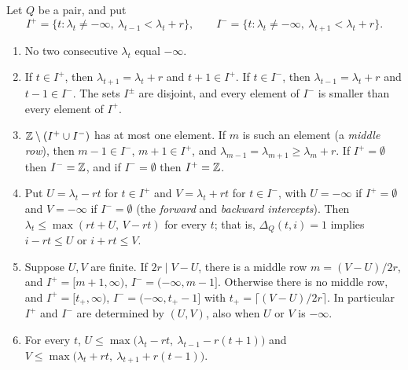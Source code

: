 \begin{proposition}\label{gen:prop:profile}
Let $Q$ be a pair, and put
\[
I^+=\{t:\lambda_t\ne-\infty,\ \lambda_{t-1}<\lambda_t+r\},\qquad I^-=\{t:\lambda_t\ne-\infty,\ \lambda_{t+1}<\lambda_t+r\}.
\]
\begin{enumerate}
\item No two consecutive $\lambda_t$ equal $-\infty$.
\item If $t\in I^+$, then $\lambda_{t+1}=\lambda_t+r$ and $t+1\in I^+$. If $t\in I^-$, then $\lambda_{t-1}=\lambda_t+r$ and $t-1\in I^-$. The sets $I^\pm$ are disjoint, and every element of $I^-$ is smaller than every element of $I^+$.
\item $\mathbb{Z}\setminus(I^+\cup I^-)$ has at most one element. If $m$ is such an element (a \emph{middle row}), then $m-1\in I^-$, $m+1\in I^+$, and $\lambda_{m-1}=\lambda_{m+1}\ge\lambda_m+r$. If $I^+=\emptyset$ then $I^-=\mathbb{Z}$, and if $I^-=\emptyset$ then $I^+=\mathbb{Z}$.
\item Put $U=\lambda_t-rt$ for $t\in I^+$ and $V=\lambda_t+rt$ for $t\in I^-$, with $U=-\infty$ if $I^+=\emptyset$ and $V=-\infty$ if $I^-=\emptyset$ (the \emph{forward} and \emph{backward intercepts}). Then $\lambda_t\le\max(rt+U,\,V-rt)$ for every $t$; that is, $\Delta_Q(t,i)=1$ implies $i-rt\le U$ or $i+rt\le V$.
\item Suppose $U,V$ are finite. If $2r\mid V-U$, there is a middle row $m=(V-U)/2r$, and $I^+=[m+1,\infty)$, $I^-=(-\infty,m-1]$. Otherwise there is no middle row, and $I^+=[t_+,\infty)$, $I^-=(-\infty,t_+-1]$ with $t_+=\lceil(V-U)/2r\rceil$. In particular $I^+$ and $I^-$ are determined by $(U,V)$, also when $U$ or $V$ is $-\infty$.
\item For every $t$, $U\le\max\bigl(\lambda_t-rt,\ \lambda_{t-1}-r(t+1)\bigr)$ and $V\le\max\bigl(\lambda_t+rt,\ \lambda_{t+1}+r(t-1)\bigr)$.
\end{enumerate}
\end{proposition}

